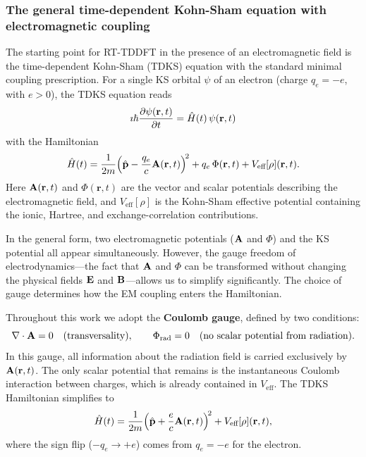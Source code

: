 \subsubsection{The general time-dependent Kohn-Sham equation with
               electromagnetic coupling}
\label{sec:tdks-em}

The starting point for RT-TDDFT in the presence of an electromagnetic
field is the time-dependent Kohn-Sham (TDKS) equation with the
standard minimal coupling prescription.  For a single KS orbital
$\psi$ of an electron (charge $q_e = -e$, with $e > 0$), the TDKS
equation reads
\begin{equation}
  \imath\hbar\frac{\partial\psi(\mathbf{r},t)}{\partial t}
  = \hat{H}(t)\,\psi(\mathbf{r},t)
  \label{eq:tdks-general}
\end{equation}
with the Hamiltonian
\begin{equation}
  \hat{H}(t)
  = \frac{1}{2m}
    \!\left(\hat{\mathbf{p}} - \frac{q_e}{c}\mathbf{A}(\mathbf{r},t)\right)^{\!2}
  + q_e\,\Phi(\mathbf{r},t)
  + V_\text{eff}[\rho](\mathbf{r},t).
  \label{eq:H-general}
\end{equation}
Here $\mathbf{A}(\mathbf{r},t)$ and $\Phi(\mathbf{r},t)$ are the vector
and scalar potentials describing the electromagnetic field, and
$V_\text{eff}[\rho]$ is the Kohn-Sham effective potential containing
the ionic, Hartree, and exchange-correlation contributions.

In the general form, two electromagnetic potentials ($\mathbf{A}$ and
$\Phi$) and the KS potential all appear simultaneously.  However,
the gauge freedom of electrodynamics---the fact that $\mathbf{A}$ and
$\Phi$ can be transformed without changing the physical fields
$\mathbf{E}$ and $\mathbf{B}$---allows us to simplify significantly.
The choice of gauge determines how the EM coupling enters the
Hamiltonian.

Throughout this work we adopt the \textbf{Coulomb gauge}, defined
by two conditions:
\begin{equation}
  \nabla\cdot\mathbf{A} = 0
  \quad\text{(transversality)},
  \qquad
  \Phi_\text{rad} = 0
  \quad\text{(no scalar potential from radiation)}.
  \label{eq:coulomb-gauge}
\end{equation}
In this gauge, all information about the radiation field is carried
exclusively by $\mathbf{A}(\mathbf{r},t)$.  The only scalar potential
that remains is the instantaneous Coulomb interaction between
charges, which is already contained in $V_\text{eff}$.
The TDKS Hamiltonian simplifies to
\begin{equation}
  \hat{H}(t)
  = \frac{1}{2m}
    \!\left(\hat{\mathbf{p}} + \frac{e}{c}\mathbf{A}(\mathbf{r},t)\right)^{\!2}
  + V_\text{eff}[\rho](\mathbf{r},t),
  \label{eq:H-coulomb}
\end{equation}
where the sign flip ($-q_e \to +e$) comes from $q_e = -e$ for the
electron.

